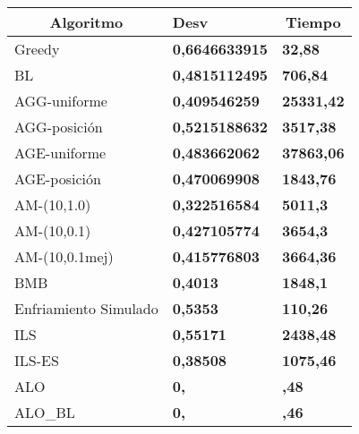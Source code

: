    \begin{table}[H]
    \centering
     \begin{tabular}{|l|l|l|}
     \hline
     \multicolumn{1}{|c|}{Algoritmo}   & \multicolumn{1}{l|}{Desv}                   & \multicolumn{1}{c|}{Tiempo}          \\\hline
        Greedy                            & \textbf{0,6646633915}                       & \textbf{32,88}                       \\\hline
        BL                                & \textbf{0,4815112495}                       & \textbf{706,84}                      \\\hline
        AGG-uniforme                      & \textbf{0,409546259}                       & \textbf{25331,42}  \\\hline
        AGG-posición                      & \textbf{0,5215188632}                      & \textbf{3517,38}                      \\\hline
        AGE-uniforme                      & \textbf{0,483662062  }                      & \textbf{37863,06}                                             \\\hline
        AGE-posición                      & \textbf{0,470069908 }                      & \textbf{1843,76}                                               \\\hline
        AM-(10,1.0)                       & \textbf{0,322516584  }                      & \textbf{5011,3 }                     \\ \hline
        AM-(10,0.1)                       & \textbf{0,427105774  }                      & \textbf{3654,3  }                       \\ \hline
        AM-(10,0.1mej)                    & \textbf{0,415776803  }                      & \textbf{3664,36  }                      \\ \hline
        BMB                               & \textbf{0,4013}                             & \textbf{1848,1}                      \\\hline
        Enfriamiento Simulado             & \textbf{0,5353}                             & \textbf{110,26}                      \\\hline
        ILS                               & \textbf{0,55171}                            & \textbf{2438,48}                     \\\hline                
        ILS-ES                            & \textbf{0,38508}                            & \textbf{1075,46}                     \\\hline                                               
        ALO                               & \textbf{0,}                            & \textbf{,48}                     \\\hline                
        ALO\_BL                            & \textbf{0,}                            & \textbf{,46}                     \\\hline 
     \end{tabular}
     \end{table}



